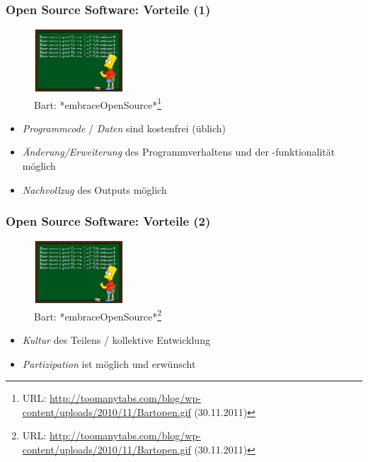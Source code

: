 \documentclass{beamer}
\begin{document}
\begin{frame}
\frametitle{Open Source Software: Vorteile (1)}
\begin{figure}
  \includegraphics[width=0.30\textwidth]{graphics/bartopen}
  \caption{Bart: *embraceOpenSource*\footnote{URL: \url{http://toomanytabs.com/blog/wp-content/uploads/2010/11/Bartopen.gif} (30.11.2011)}}
  \end{figure}
\begin{itemize}
\item \emph{Programmcode} / \emph{Daten} sind kostenfrei (üblich)
\item \emph{Änderung/Erweiterung} des Programmverhaltens und der -funktionalität möglich
\item \emph{Nachvollzug} des Outputs möglich
\end{itemize}
\end{frame}
\begin{frame}
\frametitle{Open Source Software: Vorteile (2)}
\begin{figure}
  \includegraphics[width=0.30\textwidth]{graphics/bartopen}
  \caption{Bart: *embraceOpenSource*\footnote{URL: \url{http://toomanytabs.com/blog/wp-content/uploads/2010/11/Bartopen.gif} (30.11.2011)}}
  \end{figure}
\begin{itemize}
\item \emph{Kultur} des Teilens / kollektive Entwicklung
\item \emph{Partizipation} ist möglich und erwünscht
\end{itemize}
\end{frame}
\end{document}

